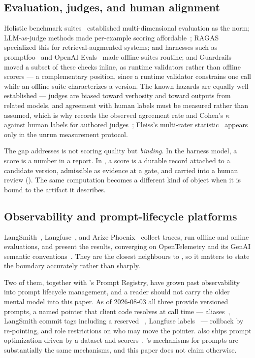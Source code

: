\subsection{Evaluation, judges, and human alignment}

Holistic benchmark suites~\cite{liang2023helm} established multi-dimensional
evaluation as the norm; LLM-as-judge methods made per-example scoring
affordable~\cite{zheng2023judging,liu2023geval}; RAGAS~\cite{es2024ragas}
specialized this for retrieval-augmented systems; and harnesses such as
promptfoo~\cite{promptfoo} and OpenAI Evals~\cite{openaievals} made offline suites
routine; and Guardrails~\cite{guardrails} moved a subset of these checks inline, as
runtime validators rather than offline scorers --- a complementary position, since a
runtime validator constrains one call while an offline suite characterizes a
version. The known hazards are equally well established --- judges are biased
toward verbosity and toward outputs from related models, and agreement with human
labels must be measured rather than assumed, which is why \sys records the observed agreement
rate and Cohen's $\kappa$ against human labels for authored
judges~\cite{cohen1960kappa}; Fleiss's multi-rater
statistic~\cite{fleiss1971kappa} appears only in the unrun measurement protocol.

The gap \sys addresses is not scoring quality but \emph{binding}. In the harness
model, a score is a number in a report. In \sys, a score is a durable record
attached to a candidate version, admissible as evidence at a gate, and carried
into a human review (). The same computation becomes a different
kind of object when it is bound to the artifact it describes.

\subsection{Observability and prompt-lifecycle platforms}

LangSmith~\cite{langsmith}, Langfuse~\cite{langfuse}, and Arize
Phoenix~\cite{phoenix} collect traces, run offline and online evaluations, and
present the results, converging on OpenTelemetry and its GenAI semantic
conventions~\cite{opentelemetry,semanticconv}. They are the closest neighbours to
\sys, so it matters to state the boundary accurately rather than sharply.

Two of them, together with \mlflow{}'s Prompt Registry, have grown past
observability into prompt lifecycle management, and a reader should not carry the
older mental model into this paper. As of 2026-08-03 all three provide versioned
prompts, a named pointer that client code resolves at call time --- \mlflow{}
aliases~\cite{mlflowpromptregistry}, LangSmith commit tags including a reserved
~\cite{langsmithprompts}, Langfuse
labels~\cite{langfuseprompts} --- rollback by re-pointing, and role restrictions
on who may move the pointer. \mlflow{} also ships prompt optimization driven by a
dataset and scorers~\cite{mlflowoptimize}. \sys's mechanisms for prompts are
substantially the same mechanisms, and this paper does not claim otherwise.

